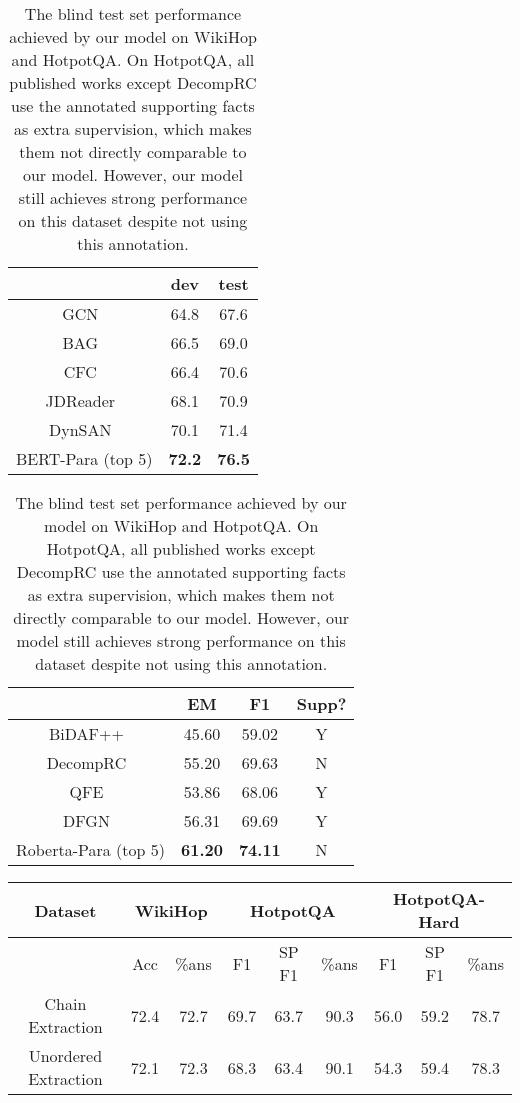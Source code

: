 \documentclass[11pt,a4paper]{article}
\begin{document}
\begin{table}[t]
\small
\centering
\renewcommand{\tabcolsep}{1.3mm}
\begin{tabular}{ c | c   c  }
\toprule
   & dev & test \\ 
\midrule
GCN~\citep{de2018question} & 64.8 & 67.6 \\
BAG~\citep{cao2019bag} & 66.5 & 69.0 \\
CFC~\citep{zhong2019coarse} & 66.4 & 70.6 \\
JDReader~\citep{tu2019multi} & 68.1 & 70.9 \\
DynSAN~\citep{zhuang2019token} & 70.1 & 71.4 \\
BERT-Para (top 5) & \textbf{72.2} & \textbf{76.5} \\
\bottomrule
\end{tabular}
\hfill
\begin{tabular}{ c | c   c | c }
\toprule
   & EM & F1 & Supp? \\ 
\midrule
BiDAF++~\citep{yang2018hotpotqa} & 45.60 & 59.02 & Y \\
DecompRC~\citep{MinZZH19} & 55.20 & 69.63 & N \\
QFE~\citep{Nishida2019QFE} & 53.86 & 68.06 & Y\\
DFGN~\citep{Qiu2019DFGN} & 56.31	& 69.69	 & Y \\
Roberta-Para (top 5) & \textbf{61.20}	 & \textbf{74.11}  & N\\
\bottomrule
\end{tabular}
\caption{The blind test set performance achieved by our model on WikiHop and HotpotQA. On HotpotQA, all published works except DecompRC use the annotated supporting facts as extra supervision, which makes them not directly comparable to our model. However, our model still achieves strong performance on this dataset despite not using this annotation. }
\label{tab:test_results}
\end{table}

\begin{table*}[t]
\small
\centering
\renewcommand{\tabcolsep}{1.3mm}
\begin{tabular}{ c | c   c   |  c  c c | c c c }
\toprule
 Dataset & \multicolumn{2}{c|}{WikiHop} & \multicolumn{3}{c|}{HotpotQA} & \multicolumn{3}{c}{HotpotQA-Hard} \\ 
\midrule
 & Acc &  \%ans  & F1 & SP F1 & \%ans &  F1 & SP F1 &  \%ans  \\ \midrule
Chain Extraction & 72.4 & 72.7 & 69.7 & 63.7 & 90.3 & 56.0 & 59.2 & 78.7 \\
Unordered Extraction & 72.1 & 72.3 & 68.3 & 63.4 & 90.1 & 54.3 & 59.4 & 78.3 \\
\bottomrule
\end{tabular}
\caption{The downstream QA performance of the chains generated by different models on different datasets. The performance is evaluated by accuracy and F1 score respectively in WikiHop and HotpotQA dataset.}
\label{tab:performance_oracle_model}
\end{table*}
\end{document}
